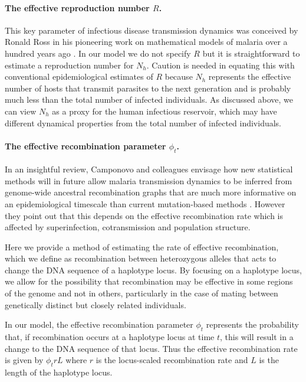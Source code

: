 \documentclass[_main.tex]{subfiles}
\begin{document}
\paragraph{The effective reproduction number $R$.}  This key parameter of infectious disease transmission dynamics was conceived by Ronald Ross in his pioneering work on mathematical models of malaria over a hundred years ago \cite{Ross1915,Smith2012}.   In our model we do not specify $R$ but it is straightforward to estimate a reproduction number for $N_h$. Caution is needed in equating this with conventional epidemiological estimates of $R$ because $N_h$ represents the effective number of hosts that transmit parasites to the next generation and is probably much less than the total number of infected individuals.  As discussed above, we can view $N_h$ as a proxy for the human infectious reservoir, which may have different dynamical properties from the total number of infected individuals.

\paragraph{The effective recombination parameter $\phi_t$.}  In an insightful review, Camponovo and colleagues envisage how new statistical methods \cite{Kelleher2019,Speidel2019} will in future allow malaria transmission dynamics to be inferred from genome-wide ancestral recombination graphs that are much more informative on an epidemiological timescale than current mutation-based methods \cite{Camponovo2023}.  However they point out that this depends on the effective recombination rate which is affected by superinfection, cotransmission and population structure.

Here we provide a method of estimating the rate of effective recombination, which we define as recombination between heterozygous alleles that acts to change the DNA sequence of a haplotype locus.  By focusing on a haplotype locus, we allow for the possibility that recombination may be effective in some regions of the genome and not in others, particularly in the case of mating between genetically distinct but closely related individuals. 

In our model, the effective recombination parameter $\phi_t$ represents the probability that, if recombination occurs at a haplotype locus at time $t$, this will result in a change to the DNA sequence of that locus.  Thus the effective recombination rate is given by $\phi_t r L$ where $r$ is the locus-scaled recombination rate and $L$ is the length of the haplotype locus. 
\end{document}
